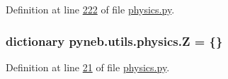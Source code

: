 Definition at line \hyperlink{physics_8py_source_l00222}{222} of file \hyperlink{physics_8py_source}{physics.\-py}.

\hypertarget{namespacepyneb_1_1utils_1_1physics_a95c816e1c7b8be2daeb4feb64868f210}{
\subsubsection[{Z}]{\setlength{\rightskip}{0pt plus 5cm}dictionary pyneb.\-utils.\-physics.\-Z = \{\}}}\label{namespacepyneb_1_1utils_1_1physics_a95c816e1c7b8be2daeb4feb64868f210}


Definition at line \hyperlink{physics_8py_source_l00021}{21} of file \hyperlink{physics_8py_source}{physics.\-py}.


